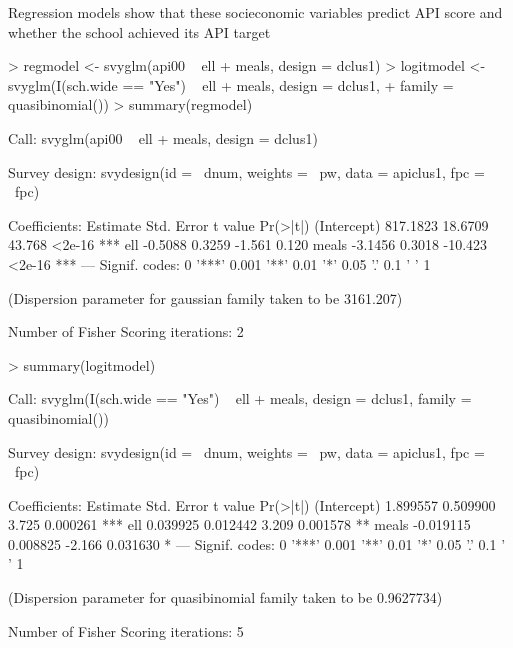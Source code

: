 \documentclass{article}
\begin{document}
Regression models show that these socieconomic variables predict API score and whether the school achieved its API target
\begin{Schunk}
\begin{Sinput}
> regmodel <- svyglm(api00 ~ ell + meals, design = dclus1)
> logitmodel <- svyglm(I(sch.wide == "Yes") ~ ell + meals, design = dclus1, 
+     family = quasibinomial())
> summary(regmodel)
\end{Sinput}
\begin{Soutput}
Call:
svyglm(api00 ~ ell + meals, design = dclus1)

Survey design:
svydesign(id = ~dnum, weights = ~pw, data = apiclus1, fpc = ~fpc)

Coefficients:
            Estimate Std. Error t value Pr(>|t|)    
(Intercept) 817.1823    18.6709  43.768   <2e-16 ***
ell          -0.5088     0.3259  -1.561    0.120    
meals        -3.1456     0.3018 -10.423   <2e-16 ***
---
Signif. codes:  0 '***' 0.001 '**' 0.01 '*' 0.05 '.' 0.1 ' ' 1 

(Dispersion parameter for gaussian family taken to be 3161.207)

Number of Fisher Scoring iterations: 2
\end{Soutput}
\begin{Sinput}
> summary(logitmodel)
\end{Sinput}
\begin{Soutput}
Call:
svyglm(I(sch.wide == "Yes") ~ ell + meals, design = dclus1, family = quasibinomial())

Survey design:
svydesign(id = ~dnum, weights = ~pw, data = apiclus1, fpc = ~fpc)

Coefficients:
             Estimate Std. Error t value Pr(>|t|)    
(Intercept)  1.899557   0.509900   3.725 0.000261 ***
ell          0.039925   0.012442   3.209 0.001578 ** 
meals       -0.019115   0.008825  -2.166 0.031630 *  
---
Signif. codes:  0 '***' 0.001 '**' 0.01 '*' 0.05 '.' 0.1 ' ' 1 

(Dispersion parameter for quasibinomial family taken to be 0.9627734)

Number of Fisher Scoring iterations: 5
\end{Soutput}
\end{Schunk}
\end{document}

